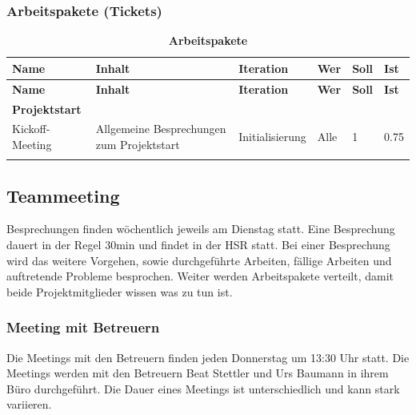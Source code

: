 \documentclass[a4,12pt]{scrartcl}
\begin{document}
\begin{landscape}
\subsubsection{Arbeitspakete (Tickets)}
\begin{longtable}{ p{5.5cm} p{8cm} l l p{1cm} p{1cm} }

\hline 
\multicolumn{1}{p{5.5cm}}{\textbf{Name}} & \multicolumn{1}{p{8cm}}{\textbf{Inhalt}} & \multicolumn{1}{l}{\textbf{Iteration}} & \multicolumn{1}{l}{\textbf{Wer}} & \multicolumn{1}{p{1cm}}{\textbf{Soll}} & \multicolumn{1}{p{1cm}}{\textbf{Ist}} \\ \hline 
\endfirsthead


\hline 
\multicolumn{1}{p{5.5cm}}{\textbf{Name}} & \multicolumn{1}{p{8cm}}{\textbf{Inhalt}} & \multicolumn{1}{l}{\textbf{Iteration}} & \multicolumn{1}{l}{\textbf{Wer}} & \multicolumn{1}{p{1cm}}{\textbf{Soll}} & \multicolumn{1}{p{1cm}}{\textbf{Ist}} \\ \hline 
\endhead


\textbf{Projektstart}&&&&\\ \addlinespace
Kickoff-Meeting & Allgemeine Besprechungen zum Projektstart & Initialisierung & Alle & 1 & 0.75 \\ \addlinespace
\hline\caption{\textbf{Arbeitspakete}}
\end{longtable}
\end{landscape}




\subsection{Teammeeting}
Besprechungen finden wöchentlich jeweils am Dienstag statt. 
Eine Besprechung dauert in der Regel 30min und findet in der HSR statt. Bei einer Besprechung wird das weitere Vorgehen, sowie durchgeführte Arbeiten, fällige Arbeiten und auftretende Probleme besprochen. Weiter werden Arbeitspakete verteilt, damit beide Projektmitglieder wissen was zu tun ist. 

\subsubsection{Meeting mit Betreuern}
Die Meetings mit den Betreuern finden jeden Donnerstag um 13:30 Uhr statt. 
Die Meetings werden mit den Betreuern Beat Stettler und Urs Baumann in ihrem Büro durchgeführt. Die Dauer eines Meetings ist unterschiedlich und kann stark variieren. 
\end{document}
